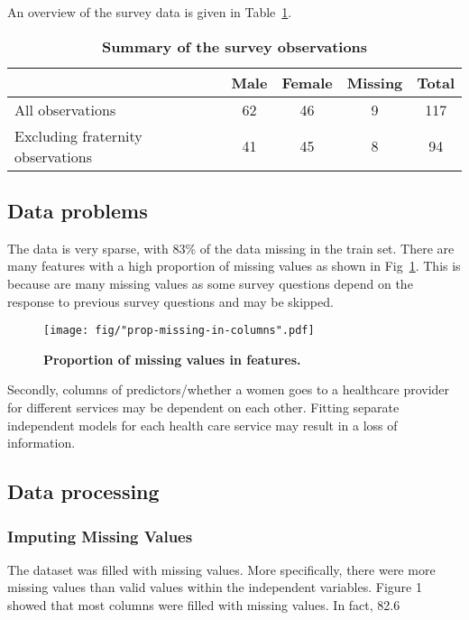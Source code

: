 \documentclass{article}\usepackage[]{graphicx}\usepackage[]{color}
\begin{document}
An overview of the survey data is given in Table~\ref{tab-data}.

\begin{table}[ht]
  \centering
  \begin{tabular}{@{}|l|c|c|c|c|@{}}
  	\hline
		& Male & Female & Missing & Total\\ 
		\hline
		All observations & 62 & 46 & 9 & 117 \\ 
			Excluding fraternity observations & 41 & 45 & 8 & 94\\ 
		\hline
	\end{tabular}
	\caption{\textbf{Summary of the survey observations}} 
  \label{tab-data}
\end{table}

\subsection{Data problems}
The data is very sparse, with 83\% of the data missing in the train set. There are many features with a high proportion of missing values as shown in Fig~\ref{fig-missing}. This is because are many missing values as some survey questions depend on the response to previous survey questions and may be skipped.

\begin{figure}[htbp]
    \begin{center}
		\texttt{[image: fig/"prop-missing-in-columns".pdf]}
		\caption{\textbf{Proportion of missing values in features.}}
		\label{fig-missing}
  \end{center}
\end{figure}

Secondly, columns of predictors/whether a women goes to a healthcare provider for different services may be dependent on each other. Fitting separate independent models for each health care service may result in a loss of information.

\subsection{Data processing}
\subsubsection{Imputing Missing Values}
The dataset was filled with missing values. More specifically, there were more missing values than valid values within the independent variables. Figure 1 showed that most columns were filled with missing values. In fact, 82.6%
\end{document}
